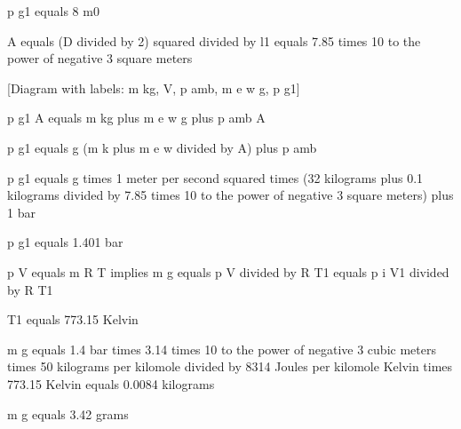 p g1 equals 8 m0

A equals (D divided by 2) squared divided by l1 equals 7.85 times 10 to the power of negative 3 square meters

[Diagram with labels: m kg, V, p amb, m e w g, p g1]

p g1 A equals m kg plus m e w g plus p amb A

p g1 equals g (m k plus m e w divided by A) plus p amb

p g1 equals g times 1 meter per second squared times (32 kilograms plus 0.1 kilograms divided by 7.85 times 10 to the power of negative 3 square meters) plus 1 bar

p g1 equals 1.401 bar

p V equals m R T implies m g equals p V divided by R T1 equals p i V1 divided by R T1

T1 equals 773.15 Kelvin

m g equals 1.4 bar times 3.14 times 10 to the power of negative 3 cubic meters times 50 kilograms per kilomole divided by 8314 Joules per kilomole Kelvin times 773.15 Kelvin equals 0.0084 kilograms

m g equals 3.42 grams